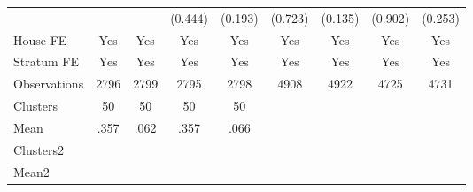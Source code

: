 {\begin{tabular}{l*{8}{c}}
                &                  &                  &  (0.444)         &  (0.193)         &  (0.723)         &  (0.135)         &  (0.902)         &  (0.253)         \\
House FE        &      Yes         &      Yes         &      Yes         &      Yes         &      Yes         &      Yes         &      Yes         &      Yes         \\
Stratum FE      &      Yes         &      Yes         &      Yes         &      Yes         &      Yes         &      Yes         &      Yes         &      Yes         \\
\midrule
Observations    &     2796         &     2799         &     2795         &     2798         &     4908         &     4922         &     4725         &     4731         \\
Clusters        &       50         &       50         &       50         &       50         &                  &                  &                  &                  \\
Mean            &     .357         &     .062         &     .357         &     .066         &                  &                  &                  &                  \\
Clusters2       &                  &                  &                  &                  &                  &                  &                  &                  \\
Mean2           &                  &                  &                  &                  &                  &                  &                  &                  \\
\bottomrule
\end{tabular}
}
